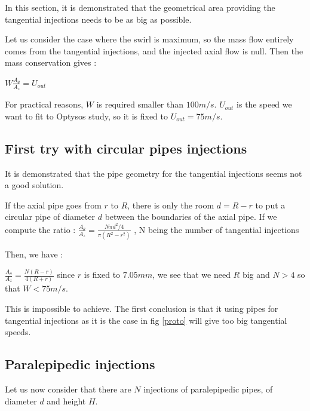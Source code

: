 In this section, it is demonstrated that the geometrical area providing the tangential injections needs to be as big as possible.

Let us consider the case where the swirl is maximum, so the mass flow entirely comes from the tangential injections, and the injected axial flow is null. Then the mass conservation gives :

$W \frac{A_{\theta}}{A_{z}}=U_{out}$ 

For practical reasons, $W$ is required smaller than $100m/s$. $U_{out}$ is the speed we want to fit to Optysos study, so it is fixed to $U_{out}=75m/s$. 

\subsection{First try with circular pipes injections}

It is demonstrated that the pipe geometry for the tangential injections seems not a good solution.

If the axial pipe goes from $r$ to $R$, there is only the room $d=R-r$ to put a circular pipe of diameter $d$ between the boundaries of the axial pipe.
If we compute the ratio :
$ \frac{A_{\theta}}{A_{z}}=\frac{N\pi d^2/4}{\pi (R^2-r^2)}$ , N being the number of tangential injections

Then, we  have :

$ \frac{A_{\theta}}{A_{z}}=\frac{N(R-r)}{4 (R+r)}$
 since $r$ is fixed to $7.05mm$, we see that we need $R$ big and $N>4$  so that $W<75m/s$.
 
 This is impossible to achieve. The first conclusion is that it using pipes for tangential injections as it is the case in fig \ref{proto} will give too big tangential speeds.
 
 \subsection{Paralepipedic injections }

Let us now consider that there are $N$ injections of paralepipedic pipes, of diameter $d$ and height $H$.



